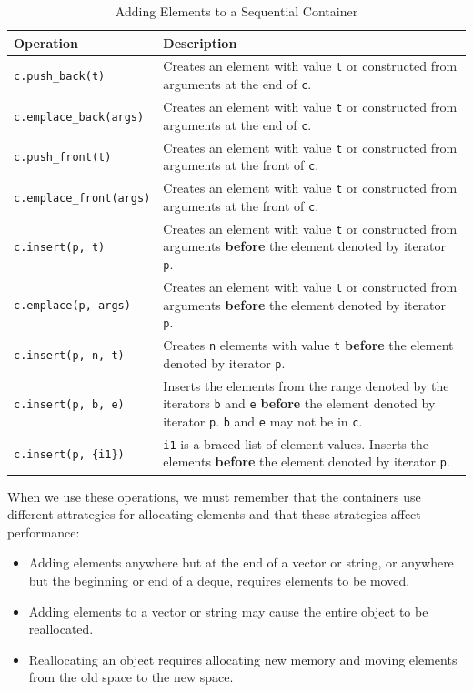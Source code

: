 \begin{table}[H]
\centering
\begin{tabular}{|l|p{11cm}|}
\hline
\textbf{Operation} & \textbf{Description} \\ \hline
\texttt{c.push\_back(t)} & Creates an element with value \texttt{t} or constructed from arguments at the end of \texttt{c}. \\ \hline
\texttt{c.emplace\_back(args)} & Creates an element with value \texttt{t} or constructed from arguments at the end of \texttt{c}. \\ \hline
\texttt{c.push\_front(t)} & Creates an element with value \texttt{t} or constructed from arguments at the front of \texttt{c}. \\ \hline
\texttt{c.emplace\_front(args)} & Creates an element with value \texttt{t} or constructed from arguments at the front of \texttt{c}. \\ \hline
\texttt{c.insert(p, t)} & Creates an element with value \texttt{t} or constructed from arguments \textbf{before} the element denoted by iterator \texttt{p}. \\ \hline
\texttt{c.emplace(p, args)} & Creates an element with value \texttt{t} or constructed from arguments \textbf{before} the element denoted by iterator \texttt{p}. \\ \hline
\texttt{c.insert(p, n, t)} & Creates \texttt{n} elements with value \texttt{t} \textbf{before} the element denoted by iterator \texttt{p}. \\ \hline
\texttt{c.insert(p, b, e)} & Inserts the elements from the range denoted by the iterators \texttt{b} and \texttt{e} \textbf{before} the element denoted by iterator \texttt{p}. \texttt{b} and \texttt{e} may not be in \texttt{c}. \\ \hline
\texttt{c.insert(p, \{i1\})} & \texttt{i1} is a braced list of element values. Inserts the elements \textbf{before} the element denoted by iterator \texttt{p}. \\ \hline
\end{tabular}
\caption{Adding Elements to a Sequential Container}
\label{tab:adding_elements}
\end{table}

When we use these operations, we must remember that the containers use different sttrategies for 
allocating elements and that these strategies affect performance:

\begin{itemize}
    \item Adding elements anywhere but at the end of a vector or string, or anywhere but the beginning
    or end of a deque, requires elements to be moved.
    \item Adding elements to a vector or string may cause the entire object to be reallocated.
    \item Reallocating an object requires allocating new memory and moving elements from the old space
    to the new space.
\end{itemize}

